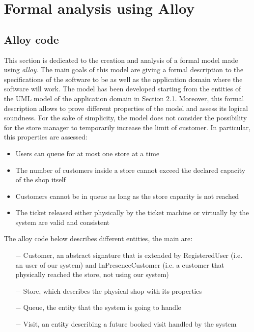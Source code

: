 \documentclass[]{article}
\begin{document}
	\newpage
	\section{Formal analysis using Alloy}
	\subsection{Alloy code}
	
	This section is dedicated to the creation and analysis of a formal model made using \textit{alloy}. \newline
	The main goals of this model are giving a formal description to the specifications of the software to be as well as the application domain where the software will work. \newline
	The model has been developed starting from the entities of the UML model of the application domain in Section 2.1. \newline
	Moreover, this formal description allows to prove different properties of the model and assess its logical soundness. \newline
	For the sake of simplicity, the model does not consider the possibility for the store manager to temporarily increase the limit of customer. \newline
	In particular, this properties are assessed:
	
	\begin{itemize}
	
		\item Users can queue for at most one store at a time
		\item The number of customers inside a store cannot exceed the declared capacity of the shop itself
		\item Customers cannot be in queue as long as the store capacity is not reached
		\item The ticket released either physically by the ticket machine or virtually by the system are valid and consistent
	
	\end{itemize}
	
	The alloy code below describes different entities, the main are:
	
	\begin{itemize}

    \item[$-$] Customer, an abstract signature that is extended by RegisteredUser (i.e. an user of our system) and InPresenceCustomer (i.e. a customer that physically reached the store, not using our system)
    \item[$-$] Store, which describes the physical shop with its properties
    \item[$-$] Queue, the entity that the system is going to handle
    \item[$-$] Visit, an entity describing a future booked visit handled by the system
    \newline
	\newline
    
	\end{itemize}
	
\end{document}
